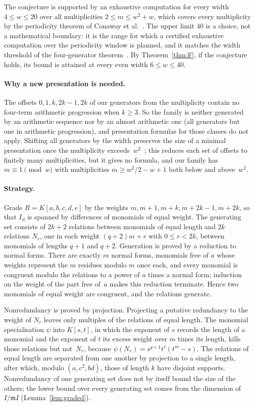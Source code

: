 \documentclass[11pt,letterpaper]{article}
\numberwithin{equation}{section}
\theoremstyle{plain}
\theoremstyle{remark}
\newcommand{\mm}{\mathfrak{m}}
\begin{document}
The conjecture is supported by an exhaustive computation for every width $4\le w\le 20$ over all multiplicities $2\le m\le w^2+w$, which covers every multiplicity by the periodicity theorem of Conaway et al.~\cite[Theorem~4.9]{CGHOPWW18}. The upper limit $40$ is a choice, not a mathematical boundary: it is the range for which a certified exhaustive computation over the periodicity window is planned, and it matches the width threshold of the four-generator theorem~\cite[Theorem~1.5]{CMS24}. By Theorem~\ref{thm:F}, if the conjecture holds, its bound is attained at every even width $6\le w\le 40$.

\paragraph{Why a new presentation is needed.}
The offsets $0,1,k,2k-1,2k$ of our generators from the multiplicity contain no four-term arithmetic progression when $k\ge 3$. So the family is neither generated by an arithmetic sequence nor by an almost arithmetic one (all generators but one in arithmetic progression), and presentation formulas for those classes do not apply. Shifting all generators by the width preserves the size of a minimal presentation once the multiplicity exceeds~$w^2$~\cite[Theorem~4.9]{CGHOPWW18}; this reduces each set of offsets to finitely many multiplicities, but it gives no formula, and our family has $m\equiv 1\pmod w$ with multiplicities $m\ge w^2/2-w+1$ both below and above~$w^2$.

\paragraph{Strategy.}
Grade $R=K[a,b,c,d,e]$ by the weights $m,m+1,m+k,m+2k-1,m+2k$, so that $I_S$ is spanned by differences of monomials of equal weight. The generating set consists of $2k+2$ relations between monomials of equal length and $2k$ relations $N_r$, one in each weight $(q+2)m+r$ with $0\le r<2k$, between monomials of lengths $q+1$ and $q+2$. Generation is proved by a reduction to normal forms. There are exactly $m$ normal forms, monomials free of $a$ whose weights represent the $m$ residues modulo $m$ once each, and every monomial is congruent modulo the relations to a power of $a$ times a normal form; induction on the weight of the part free of~$a$ makes this reduction terminate. Hence two monomials of equal weight are congruent, and the relations generate.

Nonredundancy is proved by projection. Projecting a putative redundancy to the weight of $N_r$ leaves only multiples of the relations of equal length. The monomial specialisation $\psi$ into $K[s,t]$, in which the exponent of $s$ records the length of a monomial and the exponent of $t$ its excess weight over $m$ times its length, kills those relations but not~$N_r$, because $\psi(N_r)=s^{q+1}t^r(t^m-s)$. The relations of equal length are separated from one another by projection to a single length, after which, modulo $(a,c^2,bd)$, those of length $k$ have disjoint supports. Nonredundancy of one generating set does not by itself bound the size of the others; the lower bound over every generating set comes from the dimension of $I/\mm I$ (Lemma~\ref{lem:graded}).
\end{document}
